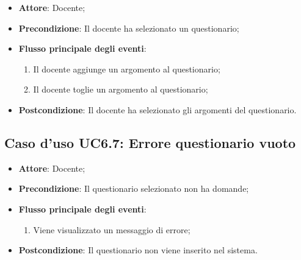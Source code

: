 \documentclass[12pt,a4paper]{article}
\begin{document}
\begin{itemize}

\item \textbf{Attore}: Docente; 
\item \textbf{Precondizione}: Il docente ha selezionato un questionario;

\item \textbf{Flusso principale degli eventi}:
\begin{enumerate}
	\item Il docente aggiunge un argomento al questionario;
	\item Il docente toglie un argomento al questionario;
	
\end{enumerate}
\item \textbf{Postcondizione}: Il docente ha selezionato gli argomenti del questionario.
\end{itemize}
\hypertarget{UC6.7}{}
\subsection{Caso d'uso UC6.7: Errore questionario vuoto}

\begin{itemize}

\item \textbf{Attore}: Docente; 
\item \textbf{Precondizione}: Il questionario selezionato non ha domande;

\item \textbf{Flusso principale degli eventi}:
\begin{enumerate}
	\item Viene visualizzato un messaggio di errore;
	
\end{enumerate}
\item \textbf{Postcondizione}: Il questionario non viene inserito nel sistema.
\end{itemize}
\hypertarget{UC7}{}
\end{document}
